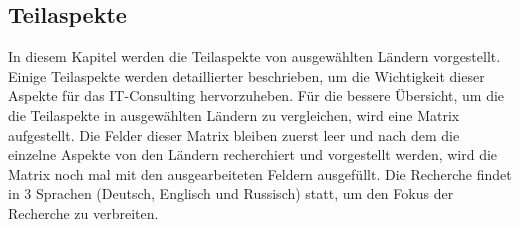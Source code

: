 \subsection{Teilaspekte}
	In diesem Kapitel werden die Teilaspekte von ausgewählten Ländern vorgestellt. Einige Teilaspekte werden detaillierter beschrieben, um die Wichtigkeit dieser Aspekte für das IT-Consulting hervorzuheben. Für die bessere Übersicht, um die die Teilaspekte in ausgewählten Ländern zu vergleichen, wird eine Matrix aufgestellt. Die Felder dieser Matrix bleiben zuerst leer und nach dem die einzelne Aspekte von den Ländern recherchiert und vorgestellt werden, wird die Matrix noch mal mit den ausgearbeiteten Feldern ausgefüllt. Die Recherche findet in 3 Sprachen (Deutsch, Englisch und Russisch) statt, um den Fokus der Recherche zu verbreiten.
	
